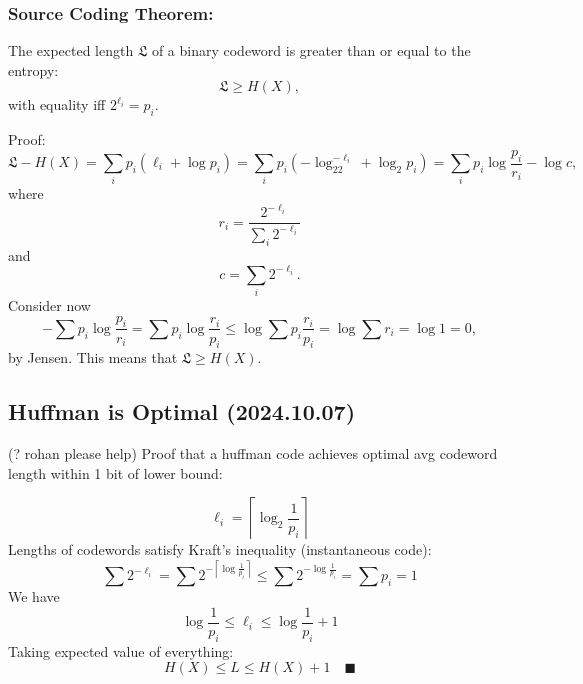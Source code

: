 \documentclass[12pt]{article}
\begin{document}
\subsubsection{Source Coding Theorem:}
The expected length $\mathfrak{L}$ of a binary codeword is greater than or equal to the entropy:
\[\mathfrak{L}\ge H(X),\]
with equality iff $2^{\ell_i}=p_i.$

Proof:
\[\mathfrak{L}-H(X)=\sum_ip_i(\ell_i+\log p_i)=\sum_ip_i(-\log_22^{-\ell_i}+\log_2 p_i)=\sum_i p_i\log\frac{p_i}{r_i}-\log c,\]
where
\[r_i=\frac{2^{-\ell_i}}{\sum_i 2^{-\ell_i}}\]
and
\[c=\sum_i 2^{-\ell_i}.\]
Consider now 
\[-\sum p_i\log\frac{p_i}{r_i}=\sum p_i\log\frac{r_i}{p_i}\le\log\sum p_i\frac{r_i}{p_i}=\log\sum r_i=\log 1=0,\] by Jensen. This means that $\mathfrak{L}\ge H(X).$

\subsection{Huffman is Optimal (2024.10.07)}
(? rohan please help) Proof that a huffman code achieves optimal avg codeword length within 1 bit of lower bound:

\[\ell_i = \left\lceil \log_2 \frac{1}{p_i} \right\rceil \]
Lengths of codewords satisfy Kraft's inequality (instantaneous code):
\[\sum 2^{-\ell_i} = \sum 2^{-\left\lceil \log \frac{1}{p_i} \right\rceil} \le \sum2^{-\log \frac{1}{p_i}} = \sum p_i = 1 \]
We have
\[ \log \frac{1}{p_i} \le \ell_i \le \log \frac{1}{p_i} + 1 \]
Taking expected value of everything:
\[H(X) \le L \le H(X) + 1 \quad \blacksquare \]
\end{document}
